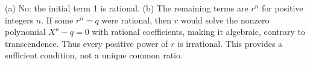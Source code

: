(a) No: the initial term 1 is rational. (b) The remaining terms are $ r^n $ for positive integers $ n $. If some $ r^n=q $ were rational, then $ r $ would solve the nonzero polynomial $ X^n-q=0 $ with rational coefficients, making it algebraic, contrary to transcendence. Thus every positive power of $ r $ is irrational. This provides a sufficient condition, not a unique common ratio.
